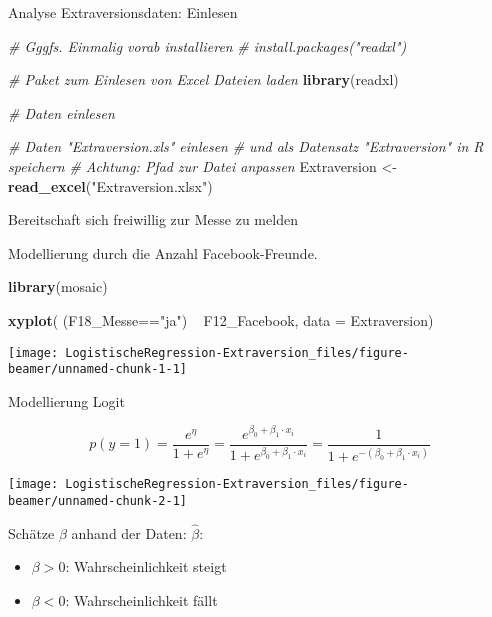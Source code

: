 \documentclass[ignorenonframetext,]{beamer}
\newenvironment{Shaded}{\begin{snugshade}}{\end{snugshade}}
\newcommand{\KeywordTok}[1]{\textcolor[rgb]{0.13,0.29,0.53}{\textbf{{#1}}}}
\newcommand{\DataTypeTok}[1]{\textcolor[rgb]{0.13,0.29,0.53}{{#1}}}
\newcommand{\StringTok}[1]{\textcolor[rgb]{0.31,0.60,0.02}{{#1}}}
\newcommand{\CommentTok}[1]{\textcolor[rgb]{0.56,0.35,0.01}{\textit{{#1}}}}
\newcommand{\NormalTok}[1]{{#1}}
\providecommand{\tightlist}{%
  \setlength{\itemsep}{0pt}\setlength{\parskip}{0pt}}
\begin{document}
\begin{frame}[fragile]{Analyse Extraversionsdaten: Einlesen}

\begin{Shaded}
\begin{Highlighting}[]
\CommentTok{# Gggfs. Einmalig vorab installieren}
\CommentTok{# install.packages("readxl")}

\CommentTok{# Paket zum Einlesen von Excel Dateien laden}
\KeywordTok{library}\NormalTok{(readxl)}

\CommentTok{# Daten einlesen}

\CommentTok{# Daten "Extraversion.xls" einlesen }
\CommentTok{# und als Datensatz "Extraversion" in R speichern}
\CommentTok{# Achtung: Pfad zur Datei anpassen}
\NormalTok{Extraversion <-}\StringTok{ }\KeywordTok{read_excel}\NormalTok{(}\StringTok{"Extraversion.xlsx"}\NormalTok{)}
\end{Highlighting}
\end{Shaded}

\end{frame}

\begin{frame}[fragile]{Bereitschaft sich freiwillig zur Messe zu melden}

Modellierung durch die Anzahl Facebook-Freunde.

\begin{Shaded}
\begin{Highlighting}[]
\KeywordTok{library}\NormalTok{(mosaic)}

\KeywordTok{xyplot}\NormalTok{( (F18_Messe==}\StringTok{"ja"}\NormalTok{) ~}\StringTok{ }\NormalTok{F12_Facebook, }
        \DataTypeTok{data =} \NormalTok{Extraversion)}
\end{Highlighting}
\end{Shaded}

\begin{center}\texttt{[image: LogistischeRegression-Extraversion\_files/figure-beamer/unnamed-chunk-1-1]} \end{center}

\end{frame}

\begin{frame}{Modellierung Logit}

\[p(y=1)=\frac{e^\eta}{1+e^\eta}=\frac{e^{\beta_0 + \beta_1 \cdot x_i}}{1+e^{\beta_0 + \beta_1 \cdot x_i}} = \frac{1}{1+e^{-(\beta_0 + \beta_1 \cdot x_i)}}\]

\begin{center}\texttt{[image: LogistischeRegression-Extraversion\_files/figure-beamer/unnamed-chunk-2-1]} \end{center}

Schätze \(\beta\) anhand der Daten: \(\hat{\beta}\):

\begin{itemize}
\tightlist
\item
  \(\beta>0\): Wahrscheinlichkeit steigt
\item
  \(\beta<0\): Wahrscheinlichkeit fällt
\end{itemize}

\end{frame}
\end{document}

